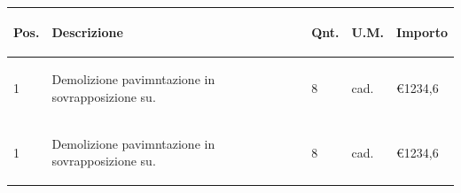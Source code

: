 \documentclass[a4paper]{article}
\begin{document}
  \noindent\begin{tabular}{ | L{10mm} |  L{86mm} | L{12mm} | L{12mm} | L{16mm} | }
  \hline
  \vspace{2.5mm}
  \begin{spacing}{0}
    \textbf{Pos.}
  \end{spacing} &
  \vspace{2.5mm}
  \begin{spacing}{0}
    \textbf{Descrizione}
  \end{spacing} &
  \vspace{2.5mm}
  \begin{spacing}{0}
    \textbf{Qnt.}
  \end{spacing} &
  \vspace{2.5mm}
  \begin{spacing}{0}
    \textbf{U.M.}
  \end{spacing} &
  \vspace{2.5mm}
  \begin{spacing}{0}
    \textbf{Importo}
  \end{spacing} \\
  \hline

  \vspace{2.5mm}
  \begin{spacing}{0}
    1
  \end{spacing} &
  \vspace{2.5mm}
  \begin{spacing}{0}
  Demolizione pavimntazione in sovrapposizione su.
  \end{spacing} &
  \vspace{2.5mm}
  \begin{spacing}{0}
    8
  \end{spacing} &
  \vspace{2.5mm}
  \begin{spacing}{0}
    cad.
  \end{spacing} &
  \vspace{2.5mm}
  \begin{spacing}{0}
    \euro\hfill 1234,6
  \end{spacing} \\
  \hline

  \vspace{2.5mm}
  \begin{spacing}{0}
    1
  \end{spacing} &
  \vspace{2.5mm}
  \begin{spacing}{0}
  Demolizione pavimntazione in sovrapposizione su.
  \end{spacing} &
  \vspace{2.5mm}
  \begin{spacing}{0}
    8
  \end{spacing} &
  \vspace{2.5mm}
  \begin{spacing}{0}
    cad.
  \end{spacing} &
  \vspace{2.5mm}
  \begin{spacing}{0}
    \euro\hfill 1234,6
  \end{spacing} \\
  \hline


\end{tabular}
\end{document}
